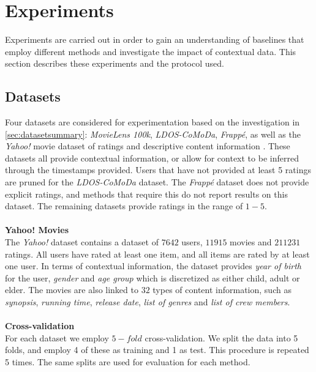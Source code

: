 \section{Experiments}
Experiments are carried out in order to gain an understanding of baselines that employ different methods and investigate the impact of contextual data.
This section describes these experiments and the protocol used.

\subsection{Datasets}
Four datasets are considered for experimentation based on the investigation in \autoref{sec:datasetsummary}: \textit{MovieLens 100k}, \textit{LDOS-CoMoDa}, \textit{Frappé}, as well as the \textit{Yahoo!} movie dataset of ratings and descriptive content information \cite{yahoo-movie}.
These datasets all provide contextual information, or allow for context to be inferred through the timestamps provided.
Users that have not provided at least 5 ratings are pruned for the \textit{LDOS-CoMoDa} dataset.
The \textit{Frappé} dataset does not provide explicit ratings, and methods that require this do not report results on this dataset.
The remaining datasets provide ratings in the range of $1-5$.
\\\\
\textbf{Yahoo! Movies}\\
The \textit{Yahoo!} dataset contains a dataset of $7642$ users, $11915$ movies and $211231$ ratings.
All users have rated at least one item, and all items are rated by at least one user.
In terms of contextual information, the dataset provides \textit{year of birth} for the user, \textit{gender} and \textit{age group} which is discretized as either child, adult or elder.
The movies are also linked to $32$ types of content information, such as \textit{synopsis}, \textit{running time}, \textit{release date}, \textit{list of genres} and \textit{list of crew members}.
\\\\
\textbf{Cross-validation}\\
For each dataset we employ $5-fold$ cross-validation.
We split the data into 5 folds, and employ 4 of these as training and 1 as test.
This procedure is repeated 5 times.
The same splits are used for evaluation for each method.

